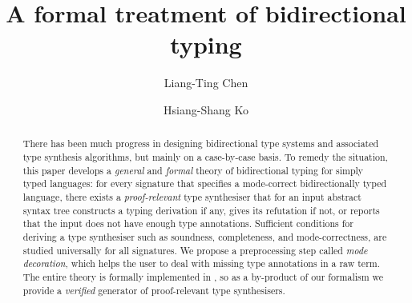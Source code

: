 \documentclass[orivec,envcountsect,envcountsame]{llncs}
\author{Liang-Ting Chen\orcidID{0000-0002-3250-1331} \and Hsiang-Shang Ko\orcidID{0000-0002-2439-1048}}
\institute{Institute of Information Science, Academia Sinica, Taiwan}
\title{A formal treatment of bidirectional typing}
\numberwithin{table}{section}
\begin{document}
\maketitle

\begin{abstract}
There has been much progress in designing bidirectional type systems and associated type synthesis algorithms, but mainly on a case-by-case basis.
To remedy the situation, this paper develops a \emph{general} and \emph{formal} theory of bidirectional typing for simply typed languages: for every signature that specifies a mode-correct bidirectionally typed language, there exists a \emph{proof-relevant} type synthesiser that for an input abstract syntax tree constructs a typing derivation if any, gives its refutation if not, or reports that the input does not have enough type annotations.
Sufficient conditions for deriving a type synthesiser such as soundness, completeness, and mode-correctness, are studied universally for all signatures.
We propose a preprocessing step called \emph{mode decoration}, which helps the user to deal with missing type annotations in a raw term.
The entire theory is formally implemented in \Agda, so as a by-product of our formalism we provide a \emph{verified} generator of proof-relevant type synthesisers.
\end{abstract}


\newif\ifarxiv 












\appendix

\ifarxiv



\fi
\end{document}

